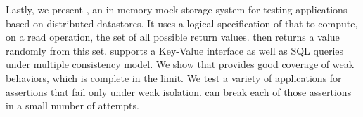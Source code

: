 Lastly, we present \tool{}, an in-memory mock storage system for testing applications based on distributed datastores. It uses a logical specification of that to compute, on a read operation, the set of all possible return values. \tool{} then returns a value randomly from this set. \tool{} supports a Key-Value interface as well as SQL queries under multiple consistency model. We show that \tool{} provides good coverage of weak behaviors, which is complete in the limit. We test a variety of applications for assertions that fail only under weak isolation. \tool{} can break each of those assertions in a small number of attempts. 
